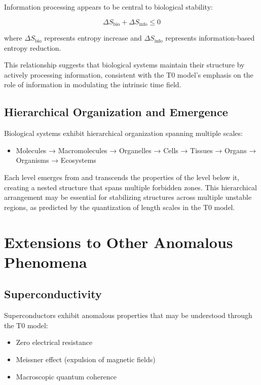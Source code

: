 \documentclass[12pt,a4paper]{article}
\begin{document}
	Information processing appears to be central to biological stability:
	
	\begin{equation}
		\Delta S_{\text{bio}} + \Delta S_{\text{info}} \leq 0
	\end{equation}
	
	where \(\Delta S_{\text{bio}}\) represents entropy increase and \(\Delta S_{\text{info}}\) represents information-based entropy reduction.
	
	This relationship suggests that biological systems maintain their structure by actively processing information, consistent with the T0 model's emphasis on the role of information in modulating the intrinsic time field.
	
	\subsection{Hierarchical Organization and Emergence}
	\label{subsec:hierarchical_organization}
	
	Biological systems exhibit hierarchical organization spanning multiple scales:
	
	\begin{itemize}
		\item Molecules → Macromolecules → Organelles → Cells → Tissues → Organs → Organisms → Ecosystems
	\end{itemize}
	
	Each level emerges from and transcends the properties of the level below it, creating a nested structure that spans multiple forbidden zones. This hierarchical arrangement may be essential for stabilizing structures across multiple unstable regions, as predicted by the quantization of length scales in the T0 model.
	
	\section{Extensions to Other Anomalous Phenomena}
	\label{sec:extensions}
	
	\subsection{Superconductivity}
	\label{subsec:superconductivity}
	
	Superconductors exhibit anomalous properties that may be understood through the T0 model:
	
	\begin{itemize}
		\item Zero electrical resistance
		\item Meissner effect (expulsion of magnetic fields)
		\item Macroscopic quantum coherence
	\end{itemize}
	
\end{document}
